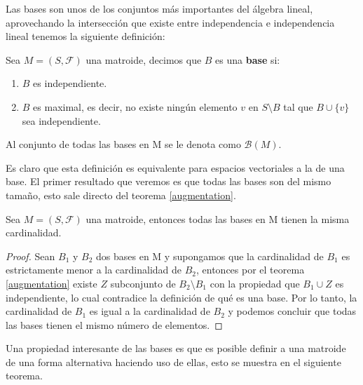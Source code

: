 Las bases son unos de los conjuntos más importantes del álgebra lineal, aprovechando la intersección que existe entre independencia e independencia lineal tenemos la siguiente definición: 

\begin{dfn}
Sea $M=(S,\mathcal{F})$ una matroide, decimos que ${B}$ es una \textbf{base} si:
\begin{enumerate}
\item ${B}$ es independiente.
\item ${B}$ es maximal, es decir, no existe ningún elemento $v$ en $S \setminus {B}$ tal que ${B} \cup \{v\}$ sea independiente.
\end{enumerate}
Al conjunto de todas las bases en M se le denota como $\mathcal{B}(M)$.
\end{dfn}

Es claro que esta definición es equivalente para espacios vectoriales a la de una base. El primer resultado que veremos es que todas las bases son del mismo tamaño, esto sale directo del teorema \ref{augmentation}. 

\begin{cor} \label{cor bases}
Sea $M=(S,\mathcal{F})$ una matroide, entonces todas las bases en M tienen la misma cardinalidad.
\end{cor}
\begin{proof}
Sean $B_1$ y $B_2$ dos bases en M y supongamos que la cardinalidad de $B_1$ es estrictamente menor a la cardinalidad de $B_2$, entonces por el teorema \ref{augmentation} existe $Z$ subconjunto de $B_2 \setminus B_1$ con la propiedad que $B_1 \cup Z$ es independiente, lo cual contradice la definición de qué es una base. Por lo tanto, la cardinalidad de $B_1$ es igual a la cardinalidad de $B_2$ y podemos concluir que todas las bases tienen el mismo número de elementos. 
\end{proof}

Una propiedad interesante de las bases es que es posible definir a una matroide de una forma alternativa haciendo uso de ellas, esto se muestra en el siguiente teorema. 

